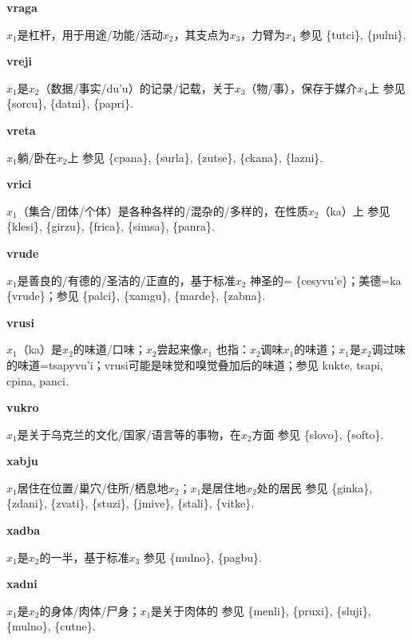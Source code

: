 \documentclass[notitlepage,twocolumn,a4paper,10pt]{book}
\begin{document}
{\sffamily\bfseries vraga}\enspace {\ttfamily\bfseries[    vra]}  $x_1$是杠杆，用于用途\slash{}功能\slash{}活动$x_2$，其支点为$x_3$，力臂为$x_4$ \textemdash{} 参见 \{tutci\}, \{pulni\}.

{\sffamily\bfseries vreji}  $x_1$是$x_2$（数据\slash{}事实\slash{}du'u）的记录\slash{}记载，关于$x_3$（物\slash{}事），保存于媒介$x_4$上 \textemdash{} 参见 \{sorcu\}, \{datni\}, \{papri\}.

{\sffamily\bfseries vreta}\enspace {\ttfamily\bfseries[    vre]}  $x_1$躺\slash{}卧在$x_2$上 \textemdash{} 参见 \{cpana\}, \{surla\}, \{zutse\}, \{ckana\}, \{lazni\}.

{\sffamily\bfseries vrici} $x_1$（集合\slash{}团体\slash{}个体）是各种各样的\slash{}混杂的\slash{}多样的，在性质$x_2$（ka）上 \textemdash{} 参见 \{klesi\}, \{girzu\}, \{frica\}, \{simsa\}, \{panra\}.

{\sffamily\bfseries vrude}\enspace {\ttfamily\bfseries[vud     vu'e]}  $x_1$是善良的\slash{}有德的\slash{}圣洁的\slash{}正直的，基于标准$x_2$ \textemdash{} 神圣的= \{cesyvu'e\}；美德=ka \{vrude\}；参见 \{palci\}, \{xamgu\}, \{marde\}, \{zabna\}.

{\sffamily\bfseries vrusi}\enspace {\ttfamily\bfseries[vus     vu'i]}  $x_1$（ka）是$x_2$的味道\slash{}口味；$x_2$尝起来像$x_1$ \textemdash{} 也指：$x_2$调味$x_1$的味道；$x_1$是$x_2$调过味的味道={tsapyvu'i}；{vrusi}可能是味觉和嗅觉叠加后的味道；参见 {kukte}, {tsapi}, {cpina}, {panci}.

{\sffamily\bfseries vukro}\enspace {\ttfamily\bfseries[vur     vu'o]}  $x_1$是关于乌克兰的文化\slash{}国家\slash{}语言等的事物，在$x_2$方面 \textemdash{} 参见 \{slovo\}, \{softo\}.

{\sffamily\bfseries xabju}\enspace {\ttfamily\bfseries[        xa'u]}  $x_1$居住在位置\slash{}巢穴\slash{}住所\slash{}栖息地$x_2$；$x_1$是居住地$x_2$处的居民 \textemdash{} 参见 \{ginka\}, \{zdani\}, \{zvati\}, \{stuzi\}, \{jmive\}, \{stali\}, \{vitke\}.

{\sffamily\bfseries xadba}\enspace {\ttfamily\bfseries[xab]}  $x_1$是$x_2$的一半，基于标准$x_3$ \textemdash{} 参见 \{mulno\}, \{pagbu\}.

{\sffamily\bfseries xadni}\enspace {\ttfamily\bfseries[xad]}  $x_1$是$x_2$的身体\slash{}肉体\slash{}尸身；$x_1$是关于肉体的 \textemdash{} 参见 \{menli\}, \{pruxi\}, \{sluji\}, \{mulno\}, \{cutne\}.
\end{document}
